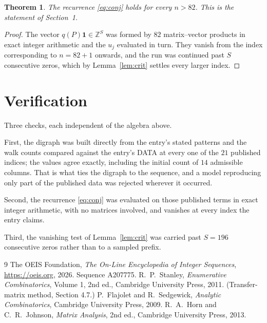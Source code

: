 \documentclass[11pt,a4paper]{article}
\theoremstyle{plain}
\newtheorem{theorem}{Theorem}
\theoremstyle{definition}
\begin{document}
\begin{theorem}
The recurrence \eqref{eq:conj} holds for every $n>82$. This is the statement of
Section~1.
\end{theorem}

\begin{proof}
The vector $q(P)\mathbf{1}\in\mathbb{Z}^{S}$ was formed by $82$ matrix--vector
products in exact integer arithmetic and the $u_j$ evaluated in turn. They vanish from the
index corresponding to $n=82+1$ onwards, and the run was continued past $S$ consecutive
zeros, which by Lemma~\ref{lem:crit} settles every larger index.
\end{proof}

\section{Verification}

Three checks, each independent of the algebra above.

First, the digraph was built directly from the entry's stated patterns and the walk counts
compared against the entry's DATA at every one of the $21$ published indices; the
values agree exactly, including the initial count of $14$ admissible columns. That is
what ties the digraph to the sequence, and a model reproducing only part of the published
data was rejected wherever it occurred.

Second, the recurrence \eqref{eq:conj} was evaluated on those published terms in exact
integer arithmetic, with no matrices involved, and vanishes at every index the entry claims.

Third, the vanishing test of Lemma~\ref{lem:crit} was carried past $S=196$ consecutive
zeros rather than to a sampled prefix.

\begin{thebibliography}{9}
 The OEIS Foundation, \emph{The On-Line Encyclopedia of Integer
Sequences}, \url{https://oeis.org}, 2026. Sequence A207775.
 R.~P.~Stanley, \emph{Enumerative Combinatorics}, Volume 1, 2nd ed.,
Cambridge University Press, 2011. (Transfer-matrix method, Section 4.7.)
 P.~Flajolet and R.~Sedgewick, \emph{Analytic Combinatorics}, Cambridge
University Press, 2009.
 R.~A.~Horn and C.~R.~Johnson, \emph{Matrix Analysis}, 2nd ed., Cambridge
University Press, 2013.
\end{thebibliography}
\end{document}
